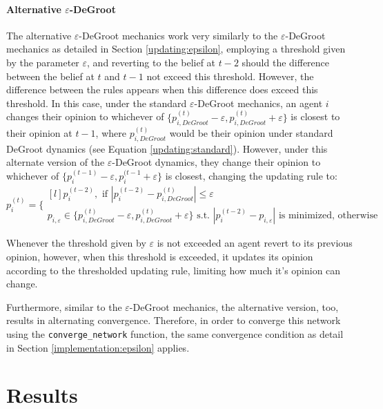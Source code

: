 \documentclass[a4paper, 12pt]{report}
\newcommand{\beli}[3][2]{p_{#2}^{(#3)}}
\begin{document}
\subsubsection{Alternative $\varepsilon$-DeGroot}

The alternative $\varepsilon$-DeGroot mechanics work very similarly to the $\varepsilon$-DeGroot mechanics as detailed in Section \ref{updating:epsilon}, employing a threshold given by the parameter $\varepsilon$, and reverting to the belief at $t-2$ should the difference between the belief at $t$ and $t-1$ not exceed this threshold. However, the difference between the rules appears when this difference does exceed this threshold. In this case, under the standard $\varepsilon$-DeGroot mechanics, an agent $i$ changes their opinion to whichever of $ \{\beli{i, DeGroot}{t}-\varepsilon, \beli{i, DeGroot}{t}+\varepsilon\}$ is closest to their opinion at $t-1$, where $\beli{i, DeGroot}{t}$ would be their opinion under standard DeGroot dynamics (see Equation \ref{updating:standard}). However, under this alternate version of the $\varepsilon$-DeGroot dynamics, they change their opinion to whichever of $\{p_{i}^{(t-1)} - \varepsilon, p_{i}^{(t-1} + \varepsilon\}$ is closest, changing the updating rule to:
\begin{equation*}
    \label{edegroot:updating}
  \beli{i}{t} =\Bigg\{
  \begin{matrix*}[l]
      \beli{i}{t-2}, \text{ if } |\beli{i}{t-2} - \beli{i, DeGroot}{t}| \leq \varepsilon\\
      p_{i, \varepsilon} \in \{\beli{i, DeGroot}{t}-\varepsilon, \beli{i, DeGroot}{t}+\varepsilon\}\text{ s.t. }|\beli{i}{t-2} - p_{i, \varepsilon}|\text{ is minimized, otherwise}
  \end{matrix*}
\end{equation*}

\noindent Whenever the threshold given by $\varepsilon$ is not exceeded an agent revert to its previous opinion, however, when this threshold is exceeded, it updates its opinion according to the thresholded updating rule, limiting how much it's opinion can change.

\noindent Furthermore, similar to the $\varepsilon$-DeGroot mechanics, the alternative version, too, results in alternating convergence. Therefore, in order to converge this network using the \texttt{converge\_network} function, the same convergence condition as detail in Section \ref{implementation:epsilon} applies.

\chapter{Results}
\label{chapter:results}
\end{document}
